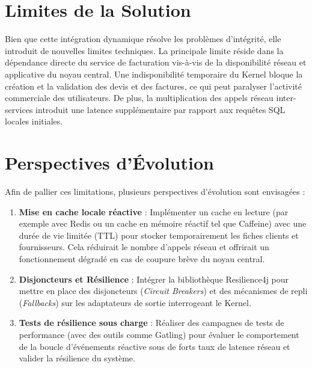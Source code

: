 \section{Limites de la Solution}
Bien que cette intégration dynamique résolve les problèmes d'intégrité, elle introduit de nouvelles limites techniques. La principale limite réside dans la dépendance directe du service de facturation vis-à-vis de la disponibilité réseau et applicative du noyau central. Une indisponibilité temporaire du Kernel bloque la création et la validation des devis et des factures, ce qui peut paralyser l'activité commerciale des utilisateurs. De plus, la multiplication des appels réseau inter-services introduit une latence supplémentaire par rapport aux requêtes SQL locales initiales.

\section{Perspectives d'Évolution}
Afin de pallier ces limitations, plusieurs perspectives d'évolution sont envisagées :
\begin{enumerate}
    \item \textbf{Mise en cache locale réactive} : Implémenter un cache en lecture (par exemple avec Redis ou un cache en mémoire réactif tel que Caffeine) avec une durée de vie limitée (TTL) pour stocker temporairement les fiches clients et fournisseurs. Cela réduirait le nombre d'appels réseau et offrirait un fonctionnement dégradé en cas de coupure brève du noyau central.
    \item \textbf{Disjoncteurs et Résilience} : Intégrer la bibliothèque Resilience4j pour mettre en place des disjoncteurs (\textit{Circuit Breakers}) et des mécanismes de repli (\textit{Fallbacks}) sur les adaptateurs de sortie interrogeant le Kernel.
    \item \textbf{Tests de résilience sous charge} : Réaliser des campagnes de tests de performance (avec des outils comme Gatling) pour évaluer le comportement de la boucle d'événements réactive sous de forts taux de latence réseau et valider la résilience du système.
\end{enumerate}
